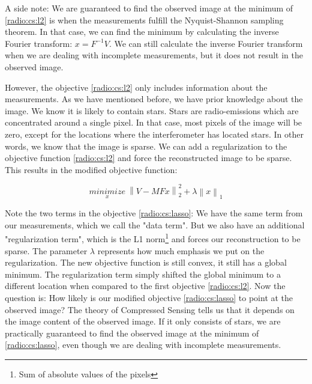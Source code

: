 A side note: We are guaranteed to find the observed image at the minimum of \eqref{radio:cs:l2} is when the measurements fulfill the Nyquist-Shannon sampling theorem. In that case, we can find the minimum by calculating the inverse Fourier transform: $x = F^{-1}V$. We can still calculate the inverse Fourier transform when we are dealing with incomplete measurements, but it does not result in the observed image.

However, the objective \eqref{radio:cs:l2} only includes information about the measurements. As we have mentioned before, we have prior knowledge about the image. We know it is likely to contain stars. Stars are radio-emissions which are concentrated around a single pixel. In that case, most pixels of the image will be zero, except for the locations where the interferometer has located stars. In other words, we know that the image is sparse. We can add a regularization to the objective function \eqref{radio:cs:l2} and force the reconstructed image to be sparse. This results in the modified objective function:

\begin{equation}\label{radio:cs:lasso}
\underset{x}{minimize} \: \left \| V - MFx \right \|_2^2 + \lambda \left \| x \right \|_1
\end{equation}

Note the two terms in the objective \eqref{radio:cs:lasso}: We have the same term from our measurements, which we call the "data term". But we also have an additional "regularization term", which is the L1 norm\footnote{Sum of absolute values of the pixels} and forces our reconstruction to be sparse. The parameter $\lambda$ represents how much emphasis we put on the regularization. The new objective function is still convex, it still has a global minimum. The regularization term simply shifted the global minimum to a different location when compared to the first objective \eqref{radio:cs:l2}. Now the question is: How likely is our modified objective \eqref{radio:cs:lasso} to point at the observed image? The theory of Compressed Sensing tells us that it depends on the image content of the observed image. If it only consists of stars, we are practically guaranteed to find the observed image at the minimum of \eqref{radio:cs:lasso}, even though we are dealing with incomplete measurements.

